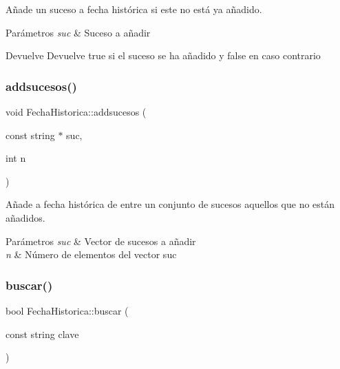 Añade un suceso a fecha histórica si este no está ya añadido. 


\begin{DoxyParams}{Parámetros}
{\em suc} & Suceso a añadir \\
\hline
\end{DoxyParams}
\begin{DoxyReturn}{Devuelve}
Devuelve true si el suceso se ha añadido y false en caso contrario 
\end{DoxyReturn}
\mbox{\label{classFechaHistorica_a0062ff553d68ee41842d19678254c27a}} 
\subsubsection{\texorpdfstring{addsucesos()}{addsucesos()}}
{\footnotesize\ttfamily void Fecha\+Historica\+::addsucesos (\begin{DoxyParamCaption}\item[{const string $\ast$}]{suc,  }\item[{int}]{n }\end{DoxyParamCaption})}



Añade a fecha histórica de entre un conjunto de sucesos aquellos que no están añadidos. 


\begin{DoxyParams}{Parámetros}
{\em suc} & Vector de sucesos a añadir \\
\hline
{\em n} & Número de elementos del vector suc \\
\hline
\end{DoxyParams}
\mbox{\label{classFechaHistorica_a7ce7b47796ace7e68af6d6c812134128}} 
\subsubsection{\texorpdfstring{buscar()}{buscar()}}
{\footnotesize\ttfamily bool Fecha\+Historica\+::buscar (\begin{DoxyParamCaption}\item[{const string}]{clave }\end{DoxyParamCaption})}




